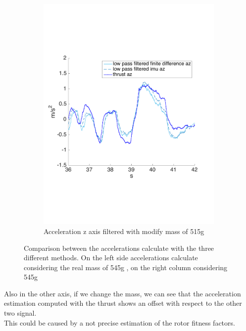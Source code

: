 \begin{figure}[!htbp]
\begin{subfigure}[b]{0.45\textwidth}
   \end{subfigure}
     \begin{subfigure}[b]{0.45\textwidth}
     \includegraphics[width=\textwidth]{img/acceleration_mass_changed_filtered_z.pdf}
        \caption{Acceleration z axis filtered with modify mass of 515g}
        \label{fig:comparison_accz_fil_mass}
   \end{subfigure}
    \caption{Comparison between the accelerations calculate with the three different methods. On the left side accelerations calculate considering the real mass of 545g , on the right column considering 545g}
    \label{fig:comparison_acc_mass}
\end{figure}

Also in the other axis, if we change the mass, we can see that the acceleration estimation computed with the thrust shows an offset with respect to the other two signal.\\ This could be caused by a not precise estimation of the rotor fitness factors.\\

